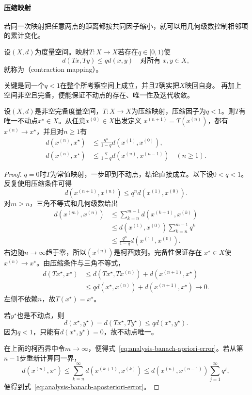 \paragraph{压缩映射}
若同一次映射把任意两点的距离都按共同因子缩小，就可以用几何级数控制相邻项的累计变化。
\begin{definition}[压缩映射]
\label{def:analysis-contraction}
设$(X,d)$为度量空间。映射$T:X\to X$若存在$q\in[0,1)$使
\begin{equation}
  d(Tx,Ty)\leq qd(x,y)
  \quad\text{对所有 }x,y\in X,
\label{eq:analysis-contraction-definition}
\end{equation}
就称为（contraction mapping）。
\end{definition}
关键是同一个$q<1$在整个所考察空间上成立，并且$T$确实把$X$映回自身。
再加上空间非空且完备，便能保证不动点的存在、唯一性及迭代收敛。
\begin{theorem}[Banach压缩映射定理]
\label{thm:analysis-banach-fixed-point}
设$(X,d)$是非空完备度量空间，$T:X\to X$为压缩映射，压缩因子为$q<1$。则$T$有
唯一不动点$x^\star\in X$。从任意$x^{(0)}\in X$出发定义
$x^{(n+1)}=T(x^{(n)})$，都有$x^{(n)}\to x^\star$，并且对$n\geq1$有
\begin{align}
  d(x^{(n)},x^\star)
  &\leq
  \frac{q^n}{1-q}d(x^{(1)},x^{(0)}),
\label{eq:analysis-banach-apriori-error}\\
  d(x^{(n)},x^\star)
  &\leq
  \frac{q}{1-q}d(x^{(n)},x^{(n-1)})
  \quad(n\geq1).
\label{eq:analysis-banach-aposteriori-error}
\end{align}
\end{theorem}
\begin{proof}
$q=0$时$T$为常值映射，一步即到不动点，结论直接成立。以下设$0<q<1$。反复使用压缩条件可得
\[   d(x^{(n+1)},x^{(n)})   \leq   q^n d(x^{(1)},x^{(0)}). \]
对$m>n$，三角不等式和几何级数给出
\begin{align*}
  d(x^{(m)},x^{(n)})
  &\leq
  \sum_{k=n}^{m-1}d(x^{(k+1)},x^{(k)})\\
  &\leq
  d(x^{(1)},x^{(0)})\sum_{k=n}^{m-1}q^k\\
  &\leq
  \frac{q^n}{1-q}d(x^{(1)},x^{(0)}).
\end{align*}
右边随$n\to\infty$趋于零，所以$(x^{(n)})$是柯西数列。完备性保证存在
$x^\star\in X$使$x^{(n)}\to x^\star$。由压缩条件与三角不等式，
\begin{align*}
 d(Tx^\star,x^\star)
 &\leq d(Tx^\star,Tx^{(n)})+d(x^{(n+1)},x^\star)\\
 &\leq qd(x^\star,x^{(n)})+d(x^{(n+1)},x^\star)
 \longrightarrow0.
\end{align*}
左侧不依赖$n$，故$T(x^\star)=x^\star$。

若$y^\star$也是不动点，则
\[   d(x^\star,y^\star)   =   d(Tx^\star,Ty^\star)   \leq qd(x^\star,y^\star). \]
因为$q<1$，只能有$d(x^\star,y^\star)=0$，故不动点唯一。

在上面的柯西界中令$m\to\infty$，便得式~\eqref{eq:analysis-banach-apriori-error}。若从第$n-1$步重新计算同一界，
\[   d(x^{(n)},x^\star)   \leq   \sum_{k=n}^{\infty}d(x^{(k+1)},x^{(k)})   \leq   d(x^{(n)},x^{(n-1)})\sum_{j=1}^{\infty}q^j, \]
便得到式~\eqref{eq:analysis-banach-aposteriori-error}。
\end{proof}

